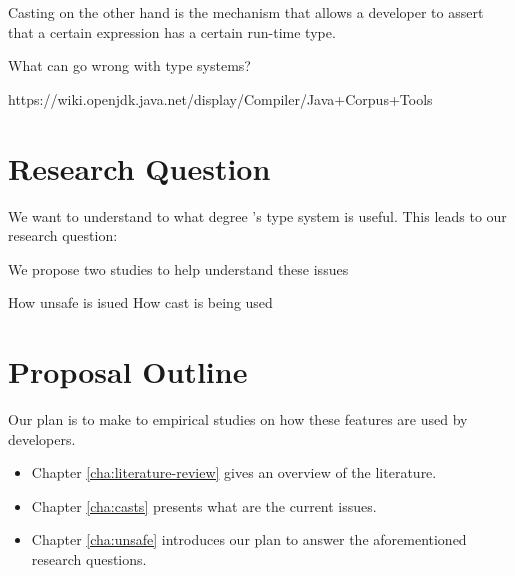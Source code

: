 Casting on the other hand is the mechanism that allows a developer to assert that a certain expression has a certain run-time type.

What can go wrong with type systems?



https://wiki.openjdk.java.net/display/Compiler/Java+Corpus+Tools

\section{Research Question}

We want to understand to what degree \java{}'s type system is useful.
This leads to our research question:


We propose two studies to help understand these issues

How unsafe is isued
How cast is being used

\section{Proposal Outline}

Our plan is to make to empirical studies on how these features are used by developers.

\begin{itemize}
\item Chapter \ref{cha:literature-review} gives an overview of the literature.
\item Chapter \ref{cha:casts} presents what are the current issues.
\item Chapter \ref{cha:unsafe} introduces our plan to answer the aforementioned research questions.
\end{itemize}
